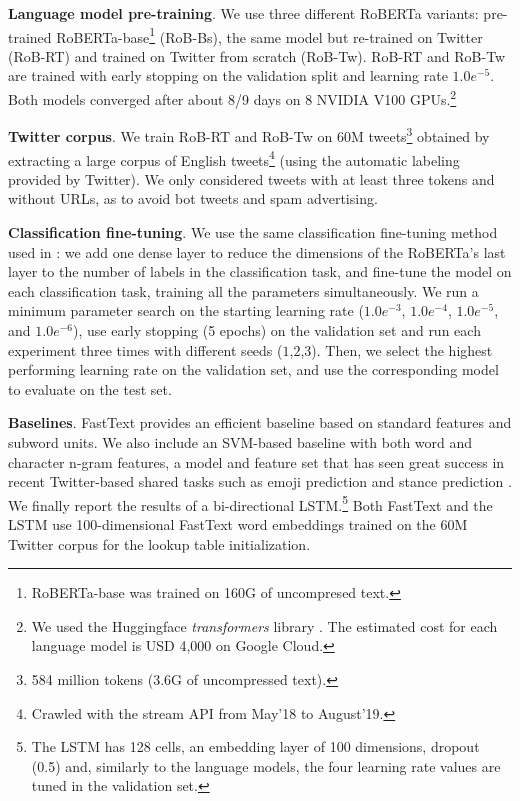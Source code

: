 \documentclass[11pt,a4paper]{article}
\begin{document}
\noindent \textbf{Language model pre-training}. We use three different RoBERTa variants: 
pre-trained RoBERTa-base\footnote{RoBERTa-base was trained on 160G of uncompresed text.} (RoB-Bs), the same model but re-trained on Twitter (RoB-RT) and trained on Twitter from scratch (RoB-Tw). RoB-RT and RoB-Tw are trained with early stopping on the validation split and learning rate $1.0e^{-5}$. Both models converged after about 8/9 days on 8 NVIDIA V100 GPUs.\footnote{We used the Huggingface \textit{transformers} library . The estimated cost for each language model is USD 4,000 on Google Cloud.}

\noindent \textbf{Twitter corpus}. We train RoB-RT and RoB-Tw on 60M tweets\footnote{584 million tokens (3.6G of uncompressed text).} obtained by extracting a large corpus of English tweets\footnote{Crawled with the stream API from May'18 to August'19.} (using the automatic labeling provided by Twitter). We only considered tweets with at least three tokens and without URLs, as to avoid bot tweets and spam advertising.

\noindent \textbf{Classification fine-tuning}. We use the same classification fine-tuning method used in : we add one dense layer to reduce the dimensions of the RoBERTa's last layer to the number of labels in the classification task, and fine-tune the model on each classification task, training all the parameters simultaneously. We run a minimum parameter search on the starting learning rate ($1.0e^{-3}$, $1.0e^{-4}$, $1.0e^{-5}$, and $1.0e^{-6}$), use early stopping (5 epochs) on the validation set and run each experiment three times with different seeds ($1$,$2$,$3$). Then, we select the highest performing learning rate on the validation set, and use the corresponding model to evaluate on the test set. 

\noindent \textbf{Baselines}. FastText \cite{joulin-etal-2017-bag} provides an efficient baseline based on standard features and subword units. We also include an SVM-based baseline with both word and character n-gram features, a model and feature set that has seen great success in recent Twitter-based shared tasks such as emoji prediction \cite{ccoltekin2018tubingen} and stance prediction \cite{mohammad2018semeval}. We finally report the results of a bi-directional LSTM.\footnote{The LSTM has 128 cells, an embedding layer of 100 dimensions, dropout (0.5) and, similarly to the language models, the four learning rate values are tuned in the validation set.} Both FastText and the LSTM use 100-dimensional FastText word embeddings \cite{bojanowski-etal-2017-enriching} trained on the 60M Twitter corpus for the lookup table initialization.
\end{document}
